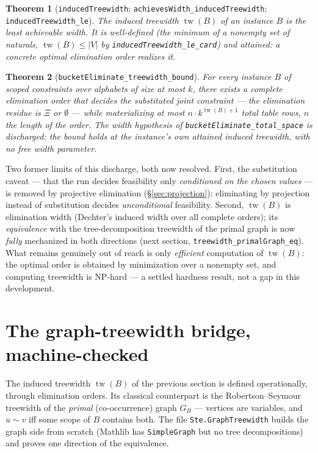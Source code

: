 \documentclass[11pt]{article}
\newtheorem{theorem}{Theorem}
\newcommand{\lean}[1]{\texttt{#1}}
\newcommand{\Xii}{\Xi}
\begin{document}
\begin{theorem}[\lean{inducedTreewidth};
\lean{achievesWidth\_inducedTreewidth}; \lean{inducedTreewidth\_le}]
The \emph{induced treewidth} $\operatorname{tw}(B)$ of an instance $B$
is the least achievable width.  It is well-defined (the minimum of a
nonempty set of naturals, $\operatorname{tw}(B) \le |V|$ by
\lean{inducedTreewidth\_le\_card}) and \emph{attained}: a concrete
optimal elimination order realizes it.
\end{theorem}

\begin{theorem}[\lean{bucketEliminate\_treewidth\_bound}]
For every instance $B$ of scoped constraints over alphabets of size at
most $k$, there \emph{exists} a complete elimination order that
decides the substituted joint constraint --- the elimination residue
is $\Xii$ or $\emptyset$ --- while materializing at most $n \cdot
k^{\operatorname{tw}(B)+1}$ total table rows, $n$ the length of the
order.  The width hypothesis of \lean{bucketEliminate\_total\_space}
is discharged: the bound holds at the instance's own attained induced
treewidth, with no free width parameter.
\end{theorem}

Two former limits of this discharge, both now resolved.  First, the
substitution caveat --- that the run decides feasibility only
\emph{conditioned on the chosen values} --- is removed by projective
elimination (\S\ref{sec:projection}): eliminating by projection instead
of substitution decides \emph{unconditional} feasibility.  Second,
$\operatorname{tw}(B)$ is elimination width (Dechter's induced width
over all complete orders); its \emph{equivalence} with the
tree-decomposition treewidth of the primal graph is now \emph{fully}
mechanized in both directions (next section,
\lean{treewidth\_primalGraph\_eq}).  What remains genuinely out of
reach is only \emph{efficient} computation of $\operatorname{tw}(B)$:
the optimal order is obtained by minimization over a nonempty set, and
computing treewidth is NP-hard
\citep{arnborg1987complexity} --- a settled hardness result, not a gap
in this development.

\section{The graph-treewidth bridge, machine-checked}

The induced treewidth $\operatorname{tw}(B)$ of the previous section is
defined operationally, through elimination orders.  Its classical
counterpart is the Robertson--Seymour treewidth of the \emph{primal}
(co-occurrence) graph $G_B$ --- vertices are variables, and $u \sim v$
iff some scope of $B$ contains both.  The file \lean{Ste.GraphTreewidth}
builds the graph side from scratch (Mathlib has \lean{SimpleGraph} but
no tree decompositions) and proves one direction of the equivalence.
\end{document}
